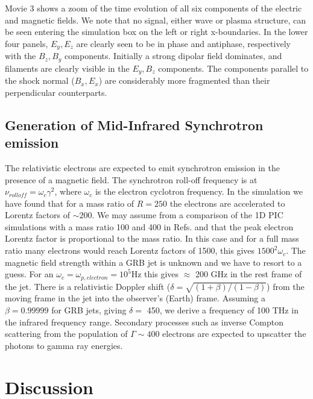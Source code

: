 \documentclass[structabstract]{aa}
\begin{document}
Movie 3 shows a zoom of the time evolution of all six components of the electric and magnetic fields.
{ We note that no signal, either wave or plasma structure, can be seen entering the simulation box on the left or right x-boundaries.}
In the lower four panels, $E_y, E_z$ are clearly seen to be in phase and antiphase, respectively with the $B_z, B_y$ components.
Initially a strong dipolar field dominates, and filaments are clearly visible in the $E_y, B_z$ components.
The components parallel to the shock normal  ($B_x, E_x$) are considerably more fragmented than their perpendicular counterparts.


\subsection{Generation of Mid-Infrared Synchrotron emission}

The relativistic electrons are expected to emit synchrotron emission in the presence of a magnetic field. The 
synchrotron roll-off frequency is at $\nu_{rolloff}=\omega_{c} \gamma^2 $, where $\omega_c$ is the electron 
cyclotron frequency. In the simulation we have found that for a mass ratio of $R=250$ the electrons are accelerated 
to Lorentz factors of $\sim 200$. We may assume from a comparison of the 1D PIC simulations with a mass ratio
100 and 400 in Refs. \cite{Bessho:1999sf} and \cite{Dieckmann:2008dp} that the peak electron Lorentz factor is 
proportional
to the mass ratio. In this case and for a full mass ratio many electrons would reach Lorentz factors of 1500, 
this gives $1500^2 \omega_c$. The magnetic field strength within a GRB jet is unknown and we have to resort to
a guess. For an $\omega_c=\omega_{p,electron}=10^5 $Hz this gives $\approx$ 200 GHz in the rest frame of the jet. 
There is a relativistic Doppler shift ($\delta=\sqrt{ (1+\beta) / (1-\beta) }$) from the moving frame in the jet 
into the observer's (Earth) frame. Assuming a $\beta = 0.99999$ for GRB jets, giving $\delta = $ 450, we derive a 
frequency of 100 THz in the infrared frequency range. Secondary processes such as inverse Compton 
scattering from the population of $\Gamma \sim 400 $ electrons are expected to upscatter the photons to gamma 
ray energies.


\section{Discussion}
\label{Discussion}
\end{document}
